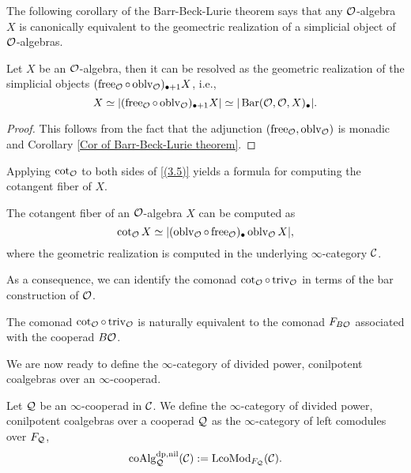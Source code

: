 The following corollary of the Barr-Beck-Lurie theorem \cite[Theorem 4.7.3.5.]{HA} says that any ${\mathcal{O}}$-algebra $X$ is canonically equivalent to the geomectric realization of a simplicial object of ${\mathcal{O}}$-algebras.
\begin{proposition}
\label{free resolutino of O-algebras}
Let $X$ be an ${\mathcal{O}}$-algebra, then it can be resolved as the geometric realization of the simplicial objects $(\operatorname{free}_{{\mathcal{O}}}\circ \operatorname{oblv}_{{\mathcal{O}}})_{\bullet + 1}X$, i.e., 
\begin{equation}
\label{(3.5)}
    X \simeq
|(\operatorname{free}_{{\mathcal{O}}}\circ \operatorname{oblv}_{{\mathcal{O}}})_{\bullet + 1}X|
\simeq |\operatorname{Bar}({\mathcal{O}}, {\mathcal{O}}, X)_{\bullet}|.
\end{equation}
\end{proposition}
\begin{proof}
    This follows from the fact that the adjunction $(\operatorname{free}_{{\mathcal{O}}}, \operatorname{oblv}_{{\mathcal{O}}})$ is monadic and Corollary \ref{Cor of Barr-Beck-Lurie theorem}.
    
\end{proof}
Applying $\cot_{{\mathcal{O}}}$ to both sides of \eqref{(3.5)} yields a formula for computing the cotangent fiber of $X$. 
\begin{corollary}
\cite[Proposition 4.4]{Heuts_Koszul}
The cotangent fiber of an ${\mathcal{O}}$-algebra $X$ can be computed as 
$$
\cot_{{\mathcal{O}}}X \simeq 
|(\operatorname{oblv}_{{\mathcal{O}}}\circ \operatorname{free}_{{\mathcal{O}}})_{\bullet}\operatorname{oblv}_{{\mathcal{O}}}X|,
$$
where the geometric realization is computed in the underlying $\infty$-category ${\mathcal{C}}$.
\end{corollary}

As a consequence, we can identify the comonad $\cot_{{\mathcal{O}}}\circ \operatorname{triv}_{{\mathcal{O}}}$ in terms of the bar construction of ${\mathcal{O}}$.
\begin{proposition}
\label{cot triv is F_BO}
\cite[Proposition 4.5]{Heuts_Koszul}
The comonad $\cot_{{\mathcal{O}}}\circ \operatorname{triv}_{{\mathcal{O}}}$ is naturally equivalent to the comonad $F_{B{\mathcal{O}}}$ associated with the cooperad $B{\mathcal{O}}$.
\end{proposition}

We are now ready to define the $\infty$-category of divided power, conilpotent coalgebras over an $\infty$-cooperad.
\begin{definition}
\label{coalgebras over a cooperad}
	Let ${\mathcal{Q}}$ be an $\infty$-cooperad in ${\mathcal{C}}$. We define the $\infty$-category of divided power, conilpotent coalgebras over a cooperad ${\mathcal{Q}}$ as the $\infty$-category of left comodules over $F_{{\mathcal{Q}}}$,
	$$
	\operatorname{coAlg}^{\operatorname{dp}, \operatorname{nil}}_{{\mathcal{Q}}}({\mathcal{C}}):= \operatorname{LcoMod}_{F_{{\mathcal{Q}}}}({\mathcal{C}}).
	$$
\end{definition}

